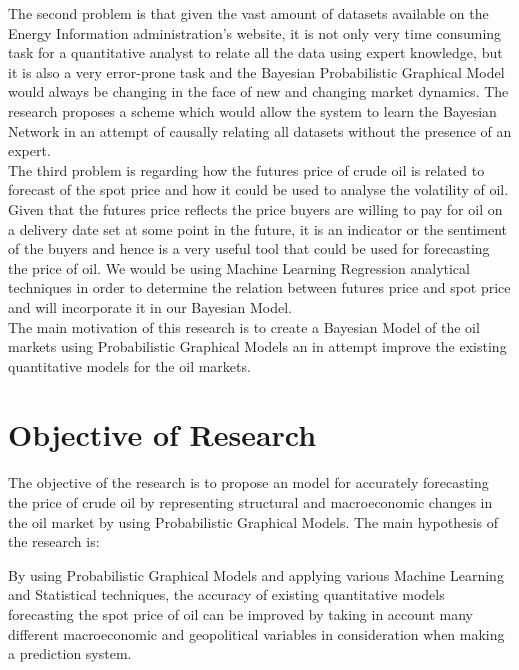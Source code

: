 The second problem is that given the vast amount of datasets available on the Energy Information administration's website, it is not only very time consuming task for a quantitative analyst to relate all the data using expert knowledge, but it is also a very error-prone task and the Bayesian Probabilistic Graphical Model would always be changing in the face of new and changing market dynamics. The research proposes a scheme which would allow the system to learn the Bayesian Network in an attempt of causally relating all datasets without the presence of an expert.\\

The third problem is regarding how the futures price of crude oil is related to forecast of the spot price and how it could be used to analyse the volatility of oil. Given that the futures price reflects the price buyers are willing to pay for oil on a delivery date set at some point in the future, it is an indicator or the sentiment of the buyers and hence is a very useful tool that could be used for forecasting the price of oil. We would be using Machine Learning Regression analytical techniques in order to determine the relation between futures price and spot price and will incorporate it in our Bayesian Model. \\

The main motivation of this research is to create a Bayesian Model of the oil markets using Probabilistic Graphical Models an in attempt improve the existing quantitative models for the oil markets.\\

\section{Objective of Research}

The objective of the research is to propose an model for accurately forecasting the price of crude oil by representing structural and macroeconomic changes in the oil market by using Probabilistic Graphical Models. The main hypothesis of the research is: \\

\begin{displayquote}
By using Probabilistic Graphical Models and applying various Machine Learning and Statistical techniques, the accuracy of existing quantitative models forecasting the spot price of oil can be improved by taking in account many different macroeconomic and geopolitical variables in consideration when making a prediction system.
\end{displayquote}



